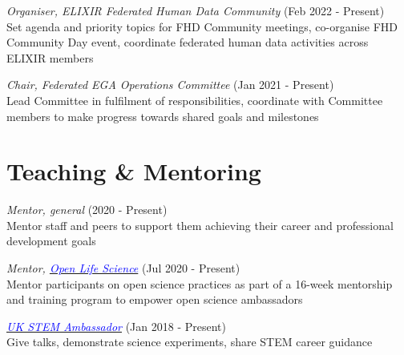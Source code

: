 \documentclass[margin,line]{res}
\begin{document}
\begin{resume}
{\em Organiser, ELIXIR Federated Human Data Community} (Feb 2022 - Present)\\
Set agenda and priority topics for FHD Community meetings, co-organise FHD Community Day event, coordinate federated human data activities across ELIXIR members

{\em Chair, Federated EGA Operations Committee} (Jan 2021 - Present)\\
Lead Committee in fulfilment of responsibilities, coordinate with Committee members to make progress towards shared goals and milestones

\section{\sc Teaching \& Mentoring}
{\em Mentor, general} (2020 - Present)\\
Mentor staff and peers to support them achieving their career and professional development goals

{\em Mentor, \href{https://openlifesci.org/}{\textcolor{blue}{Open Life Science}}} (Jul 2020 - Present)\\
Mentor participants on open science practices as part of a 16-week mentorship and training program to empower open science ambassadors

{\em \href{https://www.stem.org.uk//}{\textcolor{blue}{UK STEM Ambassador}}} (Jan 2018 - Present)\\
Give talks, demonstrate science experiments, share STEM career guidance





\end{resume}
\end{document}
